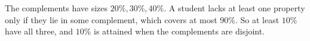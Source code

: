The complements have sizes $20\%,30\%,40\%$. A student lacks at least one property only if they lie in some complement, which covers at most $90\%$. So at least $\boxed{10\%}$ have all three, and $10\%$ is attained when the complements are disjoint.
